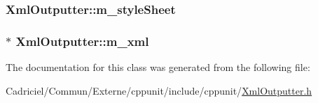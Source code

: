 \hypertarget{class_xml_outputter_a83e00800a42c2a62127e335f28b58230}{
\subsubsection[{m\-\_\-style\-Sheet}]{ Xml\-Outputter\-::m\-\_\-style\-Sheet\hspace{0.3cm}{\ttfamily [protected]}}}\label{class_xml_outputter_a83e00800a42c2a62127e335f28b58230}
\hypertarget{class_xml_outputter_a7c789c60c2031edc2527e75e736612cb}{
\subsubsection[{m\-\_\-xml}]{$\ast$ Xml\-Outputter\-::m\-\_\-xml\hspace{0.3cm}{\ttfamily [protected]}}}\label{class_xml_outputter_a7c789c60c2031edc2527e75e736612cb}


The documentation for this class was generated from the following file\-:\begin{DoxyCompactItemize}
\item 
Cadriciel/\-Commun/\-Externe/cppunit/include/cppunit/\hyperlink{_xml_outputter_8h}{Xml\-Outputter.\-h}\end{DoxyCompactItemize}
